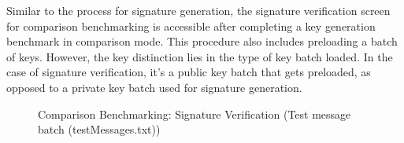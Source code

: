 \documentclass[]{final_report}
\begin{document}
Similar to the process for signature generation, the signature verification screen for comparison benchmarking is accessible after completing a key generation benchmark in comparison mode. This procedure also includes preloading a batch of keys. However, the key distinction lies in the type of key batch loaded. In the case of signature verification, it's a public key batch that gets preloaded, as opposed to a private key batch used for signature generation.


\begin{figure}[H]
    \centering %
    
    \begin{minipage}{0.4\textwidth}
        \centering
       \caption{Comparison Benchmarking: Signature Verification (Test message batch (testMessages.txt))}
        \label{fig:image1}
    \end{minipage}
    \hfill %
    \begin{minipage}{0.58\textwidth}
        \centering

\end{minipage}
\end{figure}
\end{document}
